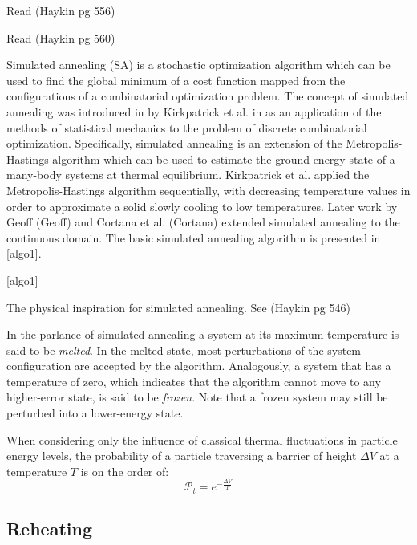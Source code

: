 \documentclass[11pt]{afthesis}
\begin{document}
	Read (Haykin pg 556)
	
	Read (Haykin pg 560)
	
	Simulated annealing (SA) is a stochastic optimization algorithm which can be used to find the global minimum of a cost function mapped from the configurations of a combinatorial optimization problem. The concept of simulated annealing was introduced in by Kirkpatrick et al. in \cite{kirkpatrick1983} as an application of the methods of statistical mechanics to the problem of discrete combinatorial optimization. Specifically, simulated annealing is an extension of the Metropolis-Hastings \cite{metropolis1953} algorithm which can be used to estimate the ground energy state of a many-body systems at thermal equilibrium. Kirkpatrick et al. applied the Metropolis-Hastings algorithm sequentially, with decreasing temperature values in order to approximate a solid slowly cooling to low temperatures. Later work by Geoff (Geoff) and Cortana et al. (Cortana) extended simulated annealing to the continuous domain. The basic simulated annealing algorithm is presented in [algo1]. 
	
	[algo1]
	
	The physical inspiration for simulated annealing. See (Haykin pg 546)
	
	
	In the parlance of simulated annealing \cite{kirkpatrick1983} a system at its maximum temperature is said to be \textit{melted}. In the melted state, most perturbations of the system configuration are accepted by the algorithm. Analogously, a system that has a temperature of zero, which indicates that the algorithm cannot move to any higher-error state, is said to be \textit{frozen}. Note that a frozen system may still be perturbed into a lower-energy state.
	
	When considering only the influence of classical thermal fluctuations in particle energy levels, the probability of a particle traversing a barrier of height \begin{math} \Delta V \end{math} at a temperature \begin{math} T \end{math} is on the order of: \begin{equation} 
	\mathcal{P}_t = e^{-\frac{\Delta V}{T}} 
	\end{equation}
	
	\subsection{Reheating}
	
\end{document}
